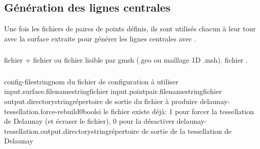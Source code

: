 	\subsection{Génération des lignes centrales}

Une fois les fichiers de paires de points définis, ils sont utilisés chacun à leur tour avec la surface extraite pour générer les lignes centrales avec .


	\subsubsection{\ioT}

\iolist
{fichier \stl + fichier \pointpair ou fichier lisible par gmsh (.geo ou maillage 1D .msh).}
{fichier \vtk.}


	\subsubsection{\argsT}

\args
{config-file}{}{string}{nom du fichier de configuration à utiliser}
{input.surface.filename}{}{string}{fichier \stl}
{input.pointpair.filename}{}{string}{fichier \pointpair}
{output.directory}{}{string}{répertoire de sortie du fichier \vtk à produire}
{delaunay-tessellation.force-rebuild}{0}{bool}{si le fichier existe déjà: 1 pour forcer la tessellation de Delaunay (et écraser le fichier), 0 pour la désactiver}
{delaunay-tessellation.output.directory}{}{string}{répertoire de sortie de la tessellation de Delaunay}
\stoparg


	\subsubsection{\etatg}
	

